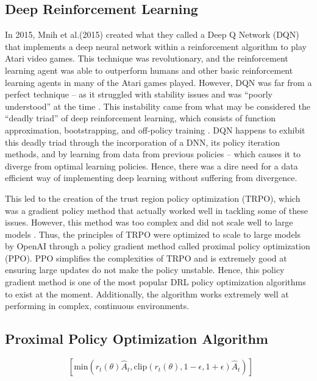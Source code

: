 \documentclass[10pt,twocolumn]{article}
\begin{document}
\subsection{Deep Reinforcement Learning}
In 2015, Mnih et al.(2015) \cite{mnih2015humanlevel} created what they called a Deep Q Network (DQN) that implements a deep neural network within a reinforcement algorithm to play Atari video games. This technique was revolutionary, and the reinforcement learning agent was able to outperform humans and other basic reinforcement learning agents in many of the Atari games played. However, DQN was far from a perfect technique – as it struggled with stability issues and was “poorly understood” at the time \cite{DBLP:journals/corr/SchulmanWDRK17}. This instability came from what may be considered the “deadly triad” of deep reinforcement learning, which consists of function approximation, bootstrapping, and off-policy training \cite{https://doi.org/10.48550/arxiv.1812.02648}. DQN happens to exhibit this deadly triad through the incorporation of a DNN, its policy iteration methods, and by learning from data from previous policies – which causes it to diverge from optimal learning policies. Hence, there was a dire need for a data efficient way of implementing deep learning without suffering from divergence.

This led to the creation of the trust region policy optimization (TRPO), which was a gradient policy method that actually worked well in tackling some of these issues. However, this method was too complex and did not scale well to large models \cite{DBLP:journals/corr/SchulmanWDRK17}. Thus, the principles of TRPO were optimized to scale to large models by OpenAI through a policy gradient method called proximal policy optimization (PPO). PPO simplifies the complexities of TRPO and is extremely good at ensuring large updates do not make the policy unstable. Hence, this policy gradient method is one of the most popular DRL policy optimization algorithms to exist at the moment. Additionally, the algorithm works extremely well at performing in complex, continuous environments.


\subsection{Proximal Policy Optimization Algorithm}
\begin{equation}
    \mathop{\hat{\mathbb{E}}}\left [ \textrm{min}\left ( r_{t}(\theta) \hat{A}_{t}, \textrm{clip}\left ( r_{t}(\theta), 1-\epsilon, 1 + \epsilon \right )\hat{A}_{t} \right )\right]
\end{equation}
\end{document}
